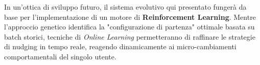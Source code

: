 In un'ottica di sviluppo futuro, il sistema evolutivo qui presentato fungerà da base per l'implementazione di un motore di \textbf{Reinforcement Learning}. Mentre l'approccio genetico identifica la "configurazione di partenza" ottimale basata su batch storici, tecniche di \textit{Online Learning} permetteranno di raffinare le strategie di nudging in tempo reale, reagendo dinamicamente ai micro-cambiamenti comportamentali del singolo utente.
